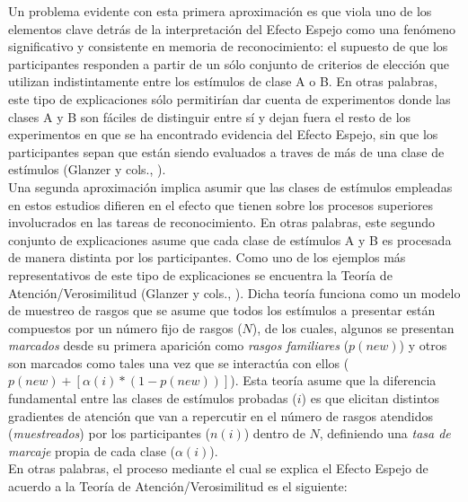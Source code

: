 Un problema evidente con esta primera aproximación es que viola uno de los elementos clave detrás de la interpretación del Efecto Espejo como una fenómeno significativo y consistente en memoria de reconocimiento: el supuesto de que los participantes responden a partir de un sólo conjunto de criterios de elección que utilizan indistintamente entre los estímulos de clase A o B. En otras palabras, este tipo de explicaciones sólo permitirían dar cuenta de experimentos donde las clases A y B son fáciles de distinguir entre sí y dejan fuera el resto de los experimentos en que se ha encontrado evidencia del Efecto Espejo, sin que los participantes sepan que están siendo evaluados a traves de más de una clase de estímulos (Glanzer y cols., \citeyear{Glanzer1998}).\\

Una segunda aproximación implica asumir que las clases de estímulos empleadas en estos estudios difieren en el efecto que tienen sobre los procesos superiores involucrados en las tareas de reconocimiento. En otras palabras, este segundo conjunto de explicaciones asume que cada clase de estímulos A y B es procesada de manera distinta por los participantes. Como uno de los ejemplos más representativos de este tipo de explicaciones se encuentra la Teoría de Atención/Verosimilitud (Glanzer y cols., \citeyear{Glanzer1993}). Dicha teoría funciona como un modelo de muestreo de rasgos que se asume que todos los estímulos a presentar están compuestos por un número fijo de rasgos ($N$), de los cuales, algunos se presentan \textit{marcados} desde su primera aparición como \textit{rasgos familiares} ($p(new)$) y otros son marcados como tales una vez que se interactúa con ellos ($p(new) + [\alpha(i)* (1-p(new))]$). Esta teoría asume que la diferencia fundamental entre  las clases de estímulos probadas ($i$) es que elicitan distintos gradientes de atención que van a repercutir en el número de rasgos atendidos (\textit{muestreados}) por los participantes ($n(i)$) dentro de $N$, definiendo una \textit{tasa de marcaje} propia de cada clase ($\alpha(i)$).\\

En otras palabras, el proceso mediante el cual se explica el Efecto Espejo de acuerdo a la Teoría de Atención/Verosimilitud es el siguiente:\\

